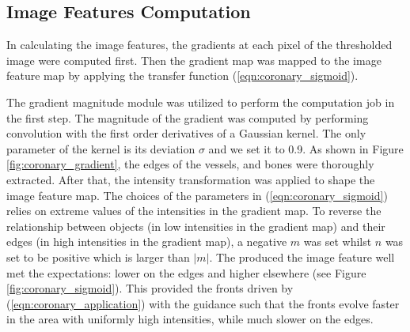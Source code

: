 \subsection{Image Features Computation}

In calculating the image features, the gradients at each pixel of the thresholded image were computed first.
Then the gradient map was mapped to the image feature map by applying the transfer function (\ref{eqn:coronary_sigmoid}).

The gradient magnitude module was utilized to perform the computation job in the first step.
The magnitude of the gradient was computed by performing convolution with the first order derivatives of a Gaussian kernel.
The only parameter of the kernel is its deviation $\sigma$ and we set it to 0.9.
As shown in Figure \ref{fig:coronary_gradient}, the edges of the vessels, and bones were thoroughly extracted.
After that, the intensity transformation was applied to shape the image feature map.
The choices of the parameters in (\ref{eqn:coronary_sigmoid}) relies on extreme values of the intensities in the gradient map.
To reverse the relationship between objects (in low intensities in the gradient map) and their edges (in high intensities in the gradient map), a negative $m$ was set whilst $n$ was set to be positive which is larger than $|m|$. %
The produced the image feature well met the expectations: lower on the edges and higher elsewhere (see Figure \ref{fig:coronary_sigmoid}).
This provided the fronts driven by (\ref{eqn:coronary_application}) with the guidance such that the fronts evolve faster in the area with uniformly high intensities, while much slower on the edges. %
